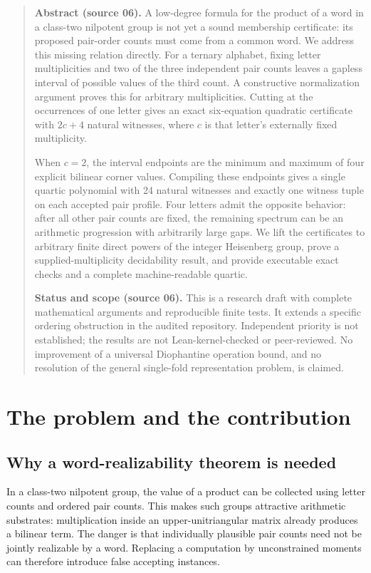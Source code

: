 \documentclass[11pt,letterpaper]{article}
\theoremstyle{definition}
\theoremstyle{remark}
\begin{document}
\begin{quote}\small
\textbf{Abstract (source 06).} A low-degree formula for the product of a word in a class-two nilpotent group is not yet a sound membership certificate: its proposed pair-order counts must come from a common word. We address this missing relation directly. For a ternary alphabet, fixing letter multiplicities and two of the three independent pair counts leaves a gapless interval of possible values of the third count. A constructive normalization argument proves this for arbitrary multiplicities. Cutting at the occurrences of one letter gives an exact six-equation quadratic certificate with $2c+4$ natural witnesses, where $c$ is that letter's externally fixed multiplicity.

When $c=2$, the interval endpoints are the minimum and maximum of four explicit bilinear corner values. Compiling these endpoints gives a single quartic polynomial with 24 natural witnesses and exactly one witness tuple on each accepted pair profile. Four letters admit the opposite behavior: after all other pair counts are fixed, the remaining spectrum can be an arithmetic progression with arbitrarily large gaps. We lift the certificates to arbitrary finite direct powers of the integer Heisenberg group, prove a supplied-multiplicity decidability result, and provide executable exact checks and a complete machine-readable quartic.

\medskip
\textbf{Status and scope (source 06).} This is a research draft with complete mathematical arguments and reproducible finite tests. It extends a specific ordering obstruction in the audited repository. Independent priority is not established; the results are not Lean-kernel-checked or peer-reviewed. No improvement of a universal Diophantine operation bound, and no resolution of the general single-fold representation problem, is claimed.
\end{quote}

\section{The problem and the contribution}
\subsection{Why a word-realizability theorem is needed}
In a class-two nilpotent group, the value of a product can be collected using letter counts and ordered pair counts. This makes such groups attractive arithmetic substrates: multiplication inside an upper-unitriangular matrix already produces a bilinear term. The danger is that individually plausible pair counts need not be jointly realizable by a word. Replacing a computation by unconstrained moments can therefore introduce false accepting instances.
\end{document}
